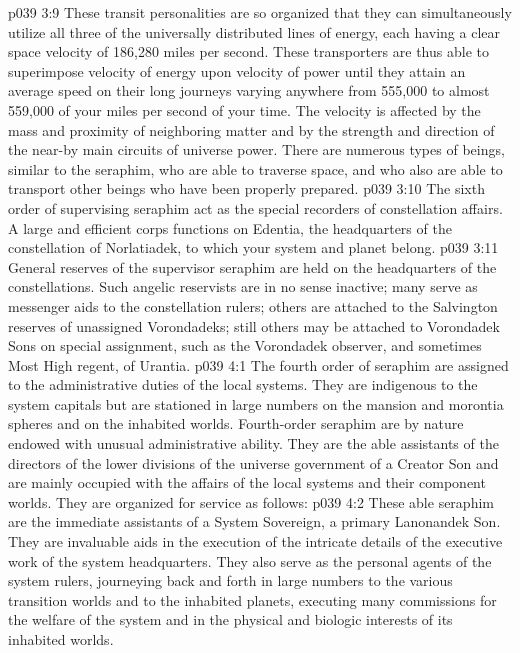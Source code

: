 \vs p039 3:9 These transit personalities are so organized that they can simultaneously utilize all three of the universally distributed lines of energy, each having a clear space velocity of 186,280 miles per second. These transporters are thus able to superimpose velocity of energy upon velocity of power until they attain an average speed on their long journeys varying anywhere from 555,000 to almost 559,000 of your miles per second of your time. The velocity is affected by the mass and proximity of neighboring matter and by the strength and direction of the near\hyp{}by main circuits of universe power. There are numerous types of beings, similar to the seraphim, who are able to traverse space, and who also are able to transport other beings who have been properly prepared.
\vs p039 3:10 \pc {}\bibnobreakspace {} The sixth order of supervising seraphim act as the special recorders of constellation affairs. A large and efficient corps functions on Edentia, the headquarters of the constellation of Norlatiadek, to which your system and planet belong.
\vs p039 3:11 \pc {}\bibnobreakspace {} General reserves of the supervisor seraphim are held on the headquarters of the constellations. Such angelic reservists are in no sense inactive; many serve as messenger aids to the constellation rulers; others are attached to the Salvington reserves of unassigned Vorondadeks; still others may be attached to Vorondadek Sons on special assignment, such as the Vorondadek observer, and sometimes Most High regent, of Urantia.
\vs p039 4:1 The fourth order of seraphim are assigned to the administrative duties of the local systems. They are indigenous to the system capitals but are stationed in large numbers on the mansion and morontia spheres and on the inhabited worlds. Fourth\hyp{}order seraphim are by nature endowed with unusual administrative ability. They are the able assistants of the directors of the lower divisions of the universe government of a Creator Son and are mainly occupied with the affairs of the local systems and their component worlds. They are organized for service as follows:
\vs p039 4:2 \pc {}\bibnobreakspace {} These able seraphim are the immediate assistants of a System Sovereign, a primary Lanonandek Son. They are invaluable aids in the execution of the intricate details of the executive work of the system headquarters. They also serve as the personal agents of the system rulers, journeying back and forth in large numbers to the various transition worlds and to the inhabited planets, executing many commissions for the welfare of the system and in the physical and biologic interests of its inhabited worlds.
